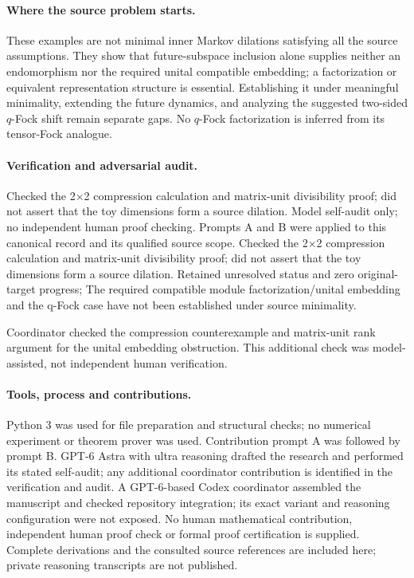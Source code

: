 \documentclass[11pt]{article}
\begin{document}
\paragraph{Where the source problem starts.} These examples are not minimal inner Markov dilations satisfying all the source assumptions. They show that future-subspace inclusion alone supplies neither an endomorphism nor the required unital compatible embedding; a factorization or equivalent representation structure is essential. Establishing it under meaningful minimality, extending the future dynamics, and analyzing the suggested two-sided $q$-Fock shift remain separate gaps. No $q$-Fock factorization is inferred from its tensor-Fock analogue.

\paragraph{Verification and adversarial audit.}
Checked the 2×2 compression calculation and matrix-unit divisibility proof; did not assert that the toy dimensions form a source dilation. Model self-audit only; no independent human proof checking. Prompts A and B were applied to this canonical record and its qualified source scope. Checked the 2×2 compression calculation and matrix-unit divisibility proof; did not assert that the toy dimensions form a source dilation. Retained unresolved status and zero original-target progress; The required compatible module factorization/unital embedding and the q-Fock case have not been established under source minimality.

Coordinator checked the compression counterexample and matrix-unit rank argument for the unital embedding obstruction. This additional check was model-assisted, not independent human verification.

\paragraph{Tools, process and contributions.}
Python 3 was used for file preparation and structural checks; no numerical experiment or theorem prover was used. Contribution prompt A was followed by prompt B. GPT-6 Astra with ultra reasoning drafted the research and performed its stated self-audit; any additional coordinator contribution is identified in the verification and audit. A GPT-6-based Codex coordinator assembled the manuscript and checked repository integration; its exact variant and reasoning configuration were not exposed. No human mathematical contribution, independent human proof check or formal proof certification is supplied. Complete derivations and the consulted source references are included here; private reasoning transcripts are not published.
\end{document}
